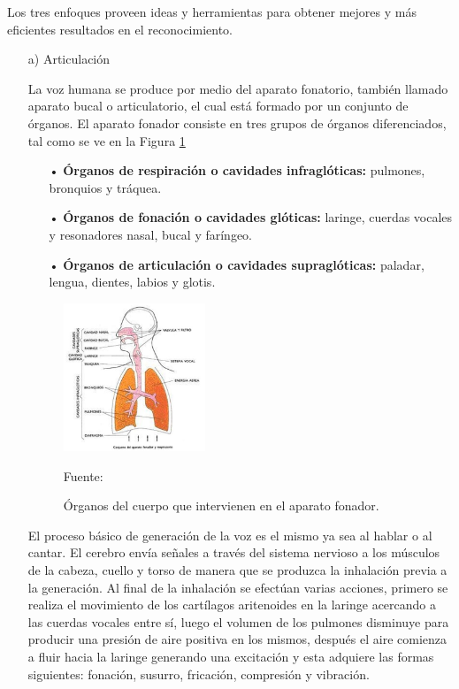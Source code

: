 Los tres enfoques proveen ideas y herramientas para obtener mejores y más eficientes resultados en el reconocimiento.

\begin{enumerate}
\item[a)]Articulación
\par
La voz humana se produce por medio del aparato fonatorio, también llamado aparato bucal o articulatorio, el cual está formado por un conjunto de órganos. El aparato fonador consiste en tres grupos de órganos diferenciados, tal como se ve en la Figura \ref{fig:figura2.1}

\begin{enumerate}
\item[•]\textbf{Órganos de respiración o cavidades infraglóticas:} pulmones, bronquios y tráquea.
\item[•]\textbf{Órganos de fonación o cavidades glóticas:} laringe, cuerdas vocales y resonadores nasal, bucal y faríngeo.
\item[•]\textbf{Órganos de articulación o cavidades supraglóticas:} paladar, lengua, dientes, labios y glotis.
\end{enumerate}

\begin{figure}[ht]
\begin{center}
\includegraphics[width=0.4\textwidth]{Imagenes/Cap2/image001}
\end{center}
\begin{center}
\vskip -0.5cm
\caption{\small{Órganos del cuerpo que intervienen en el aparato fonador.}}
\label{fig:figura2.1}
{\small{Fuente: \cite{luis}}}
\end{center}
\end{figure}

El proceso básico de generación de la voz es el mismo ya sea al hablar o al cantar. El cerebro envía señales a través del sistema nervioso a los músculos de la cabeza, cuello y torso de manera que se produzca la inhalación previa a la generación. Al final de la inhalación se efectúan varias acciones, primero se realiza el movimiento de los cartílagos aritenoides en la laringe acercando a las cuerdas vocales entre sí, luego el volumen de los pulmones disminuye para producir una presión de aire positiva en los mismos, después el aire comienza a fluir hacia la laringe generando una excitación y esta adquiere las formas siguientes: fonación, susurro, fricación, compresión y vibración.


\end{enumerate}
